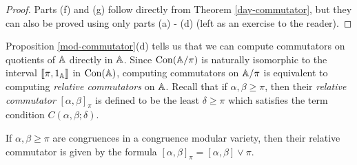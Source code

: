 \documentclass[letterpaper,11pt]{article}
\DeclareMathOperator{\Con}{Con}
\begin{document}
\begin{proof}
Parts (f) and (g) follow directly from Theorem \ref{day-commutator}, but they can also be proved using only parts (a) - (d) (left as an exercise to the reader).
\end{proof}

Proposition \ref{mod-commutator}(d) tells us that we can compute commutators on quotients of $\mathbb{A}$ directly in $\mathbb{A}$. Since $\Con(\bA/\pi)$ is naturally isomorphic to the interval $\llbracket \pi, 1_{\mathbb{A}}\rrbracket$ in $\Con(\bA)$, computing commutators on $\mathbb{A}/\pi$ is equivalent to computing \emph{relative commutators} on $\mathbb{A}$. Recall that if $\alpha,\beta \ge \pi$, then their \emph{relative commutator} $[\alpha,\beta]_\pi$ is defined to be the least $\delta \ge \pi$ which satisfies the term condition $C(\alpha,\beta;\delta)$.

\begin{cor} If $\alpha,\beta \ge \pi$ are congruences in a congruence modular variety, then their relative commutator is given by the formula $[\alpha,\beta]_\pi = [\alpha,\beta]\vee \pi$.
\end{cor}
\end{document}

